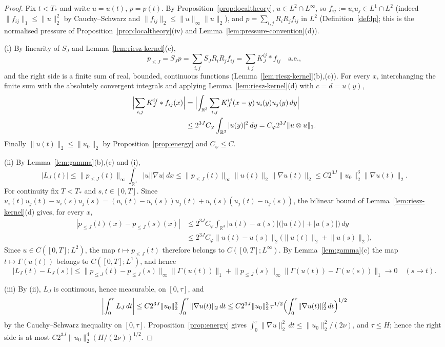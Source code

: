\documentclass[11pt]{article}
\theoremstyle{definition}
\theoremstyle{plain}
\newcommand{\R}{\mathbb R}
\newcommand{\norm}[1]{\lVert #1\rVert}
\begin{document}
\begin{proof}
Fix $t<T_*$ and write $u=u(t)$, $p=p(t)$.  By
Proposition~\ref{prop:localtheory}, $u\in L^2\cap L^\infty$, so
$f_{ij}:=u_iu_j\in L^1\cap L^2$ (indeed $\norm{f_{ij}}_1\le\norm u_2^2$ by
Cauchy--Schwarz and $\norm{f_{ij}}_2\le\norm u_\infty\norm u_2$), and
$p=\sum_{i,j}R_iR_jf_{ij}$ in $L^2$ (Definition~\ref{def:lp}; this is the
normalised pressure of Proposition~\ref{prop:localtheory}(iv) and
Lemma~\ref{lem:pressure-convention}(d)).

(i) By linearity of $S_J$ and Lemma~\ref{lem:riesz-kernel}(c),
\[
 p_{\le J}=S_Jp=\sum_{i,j}S_JR_iR_jf_{ij}=\sum_{i,j}K^{ij}_J*f_{ij}
 \quad\text{a.e.},
\]
and the right side is a finite sum of real, bounded, continuous functions
(Lemma~\ref{lem:riesz-kernel}(b),(c)).  For every $x$, interchanging the
finite sum with the absolutely convergent integrals and applying
Lemma~\ref{lem:riesz-kernel}(d) with $c=d=u(y)$,
\[
\begin{aligned}
 \Bigl|\sum_{i,j}K^{ij}_J*f_{ij}(x)\Bigr|
 &=\Bigl|\int_{\R^3}\sum_{i,j}K^{ij}_J(x-y)\,u_i(y)u_j(y)\,dy\Bigr|\\
 &\le2^{3J}C_\varphi\int_{\R^3}|u(y)|^2\,dy
 =C_\varphi2^{3J}\norm{u\otimes u}_1 .
\end{aligned}
\]
Finally $\norm{u(t)}_2\le\norm{u_0}_2$ by Proposition~\ref{prop:energy} and
$C_\varphi\le C$.

(ii) By Lemma~\ref{lem:gamma}(b),(c) and (i),
\[
 |L_J(t)|\le\norm{p_{\le J}(t)}_\infty\int_{\R^3}|u||\nabla u|\,dx
 \le\norm{p_{\le J}(t)}_\infty\norm{u(t)}_2\norm{\nabla u(t)}_2
 \le C2^{3J}\norm{u_0}_2^3\norm{\nabla u(t)}_2 .
\]
For continuity fix $T<T_*$ and $s,t\in[0,T]$.  Since
$u_i(t)u_j(t)-u_i(s)u_j(s)=(u_i(t)-u_i(s))u_j(t)+u_i(s)(u_j(t)-u_j(s))$, the
bilinear bound of Lemma~\ref{lem:riesz-kernel}(d) gives, for every $x$,
\[
\begin{aligned}
 |p_{\le J}(t)(x)-p_{\le J}(s)(x)|
 &\le2^{3J}C_\varphi\int_{\R^3}|u(t)-u(s)|\bigl(|u(t)|+|u(s)|\bigr)\,dy\\
 &\le2^{3J}C_\varphi\norm{u(t)-u(s)}_2\bigl(\norm{u(t)}_2+\norm{u(s)}_2\bigr),
\end{aligned}
\]
Since $u\in C([0,T];L^2)$, the map $t\mapsto p_{\le J}(t)$ therefore
belongs to $C([0,T];L^\infty)$.  By Lemma~\ref{lem:gamma}(c) the map
$t\mapsto\Gamma(u(t))$ belongs to $C([0,T];L^1)$, and hence
\[
 |L_J(t)-L_J(s)|
 \le\norm{p_{\le J}(t)-p_{\le J}(s)}_\infty\norm{\Gamma(u(t))}_1
 +\norm{p_{\le J}(s)}_\infty\norm{\Gamma(u(t))-\Gamma(u(s))}_1\to0
 \quad(s\to t).
\]

(iii) By (ii), $L_J$ is continuous, hence measurable, on $[0,\tau]$, and
\[
 \left|\int_0^\tau L_J\,dt\right|
 \le C2^{3J}\norm{u_0}_2^3\int_0^\tau\norm{\nabla u(t)}_2\,dt
 \le C2^{3J}\norm{u_0}_2^3\,\tau^{1/2}\Bigl(\int_0^\tau\norm{\nabla u(t)}_2^2\,dt\Bigr)^{1/2}
\]
by the Cauchy--Schwarz inequality on $[0,\tau]$.  Proposition~\ref{prop:energy}
gives $\int_0^\tau\norm{\nabla u}_2^2\,dt\le\norm{u_0}_2^2/(2\nu)$, and
$\tau\le H$; hence the right side is at most
$C2^{3J}\norm{u_0}_2^4(H/(2\nu))^{1/2}$.
\end{proof}
\end{document}
